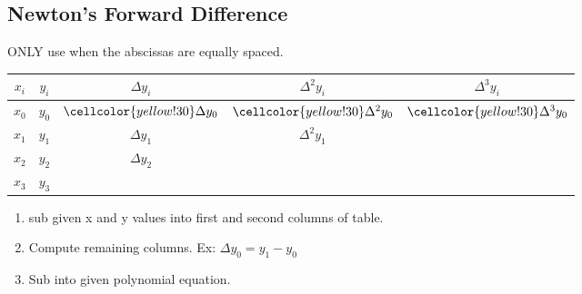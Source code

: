\documentclass[10pt]{article}
\begin{document}
\begin{multicols}{2}
\subsection*{Newton's Forward Difference}
ONLY use when the abscissas are equally spaced.\\

\begin{tabular}{ c c c c c }
    $ x_{i} $ & $ y_{i} $ & $ \Delta y_{i} $ & $ \Delta^{2} y_{i} $ & $ \Delta^{3} y_{i} $ \\
    \hline
    $ x_{0} $ & $ y_{0} $ & $ \cellcolor{yellow!30} \Delta y_{0} $ & $ \cellcolor{yellow!30} \Delta^{2} y_{0} $  & $ \cellcolor{yellow!30} \Delta^{3} y_{0} $ \\
    $ x_{1} $ & $ y_{1} $ & $ \Delta y_{1} $ & $ \Delta^{2} y_{1} $ & \\
    $ x_{2} $ & $ y_{2} $ & $ \Delta y_{2} $ & & \\
    $ x_{3} $ & $ y_{3} $ & & & \\
\end{tabular}

\begin{enumerate}
    \item sub given x and y values into first and second columns of table.
    \item Compute remaining columns. Ex: $ \Delta y_{0} =  y_{1} - y_{0} $
    \item Sub into given polynomial equation.
\end{enumerate}



\end{multicols}
\end{document}
